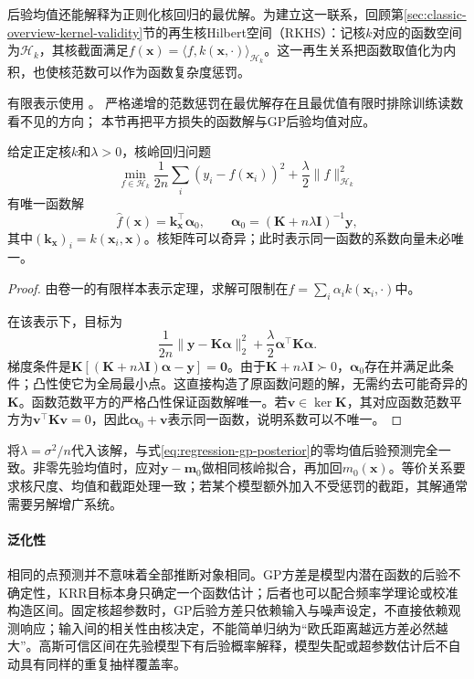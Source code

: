 后验均值还能解释为正则化核回归的最优解。为建立这一联系，回顾第\ref{sec:classic-overview-kernel-validity}节的再生核Hilbert空间（RKHS）：记核$k$对应的函数空间为$\mathcal H_k$，其核截面满足$f(\bm{x})=\langle f,k(\bm{x},\cdot)\rangle_{\mathcal H_k}$。这一再生关系把函数取值化为内积，也使核范数可以作为函数复杂度惩罚。

有限表示使用
。
严格递增的范数惩罚在最优解存在且最优值有限时排除训练读数看不见的方向；
本节再把平方损失的函数解与GP后验均值对应。

\begin{theorem}[表示定理与核岭回归解]
  \label{thm:regression-krr}
  给定正定核$k$和$\lambda>0$，核岭回归问题
  \[
    \min_{f\in\mathcal H_k}
      \frac1{2n}\sum_i(y_i-f(\bm{x}_i))^2
       +\frac{\lambda}{2}\lVert f\rVert_{\mathcal H_k}^2
  \]
  有唯一函数解
  \[
    \widehat f(\bm{x})=\bm{k}_{\bm{x}}^{\top}\bm{\alpha}_0,\qquad
    \bm{\alpha}_0=(\bm{K}+n\lambda\bm{I})^{-1}\bm{y},
  \]
  其中$(\bm{k}_{\bm{x}})_i=k(\bm{x}_i,\bm{x})$。核矩阵可以奇异；此时表示同一函数的系数向量未必唯一。
\end{theorem}

\begin{proof}
由卷一的有限样本表示定理，求解可限制在$f=\sum_i\alpha_i k(\bm{x}_i,\cdot)$中。

在该表示下，目标为
\[
  \frac1{2n}\lVert\bm{y}-\bm{K}\bm{\alpha}\rVert_2^2
       +\frac{\lambda}{2}\bm{\alpha}^{\top}\bm{K}\bm{\alpha}.
\]
梯度条件是$\bm{K}[(\bm{K}+n\lambda\bm{I})\bm{\alpha}-\bm{y}]=\bm{0}$。由于$\bm{K}+n\lambda\bm{I}\succ0$，$\bm{\alpha}_0$存在并满足此条件；凸性使它为全局最小点。这直接构造了原函数问题的解，无需约去可能奇异的$\bm{K}$。函数范数平方的严格凸性保证函数解唯一。若$\bm{v}\in\ker\bm{K}$，其对应函数范数平方为$\bm{v}^{\top}\bm{K}\bm{v}=0$，因此$\bm{\alpha}_0+\bm{v}$表示同一函数，说明系数可以不唯一。
\end{proof}

将$\lambda=\sigma^2/n$代入该解，与式\eqref{eq:regression-gp-posterior}的零均值后验预测完全一致。非零先验均值时，应对$\bm{y}-\bm{m}_0$做相同核岭拟合，再加回$m_0(\bm{x})$。等价关系要求核尺度、均值和截距处理一致；若某个模型额外加入不受惩罚的截距，其解通常需要另解增广系统。

\paragraph{泛化性}
相同的点预测并不意味着全部推断对象相同。GP方差是模型内潜在函数的后验不确定性，KRR目标本身只确定一个函数估计；后者也可以配合频率学理论或校准构造区间。固定核超参数时，GP后验方差只依赖输入与噪声设定，不直接依赖观测响应；输入间的相关性由核决定，不能简单归纳为“欧氏距离越远方差必然越大”。高斯可信区间在先验模型下有后验概率解释，模型失配或超参数估计后不自动具有同样的重复抽样覆盖率。


